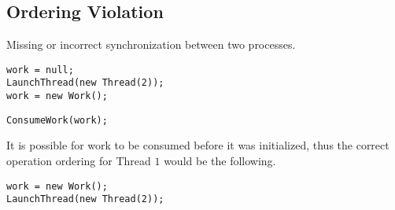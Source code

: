 \subsection{Ordering Violation}

Missing or incorrect synchronization between two processes.

\begin{lstlisting}[caption={Simple Producer, running on Thread $1$}]
work = null;
LaunchThread(new Thread(2));
work = new Work();
\end{lstlisting}

\begin{lstlisting}[caption={Simple Consumer, running on Thread $2$}]
ConsumeWork(work);
\end{lstlisting}

It is possible for work to be consumed before it was initialized,
thus the correct operation ordering for Thread $1$ would be the following.

\begin{lstlisting}[caption={Simple Correct Producer, running on Thread $1$}]
work = new Work();
LaunchThread(new Thread(2));
\end{lstlisting}
